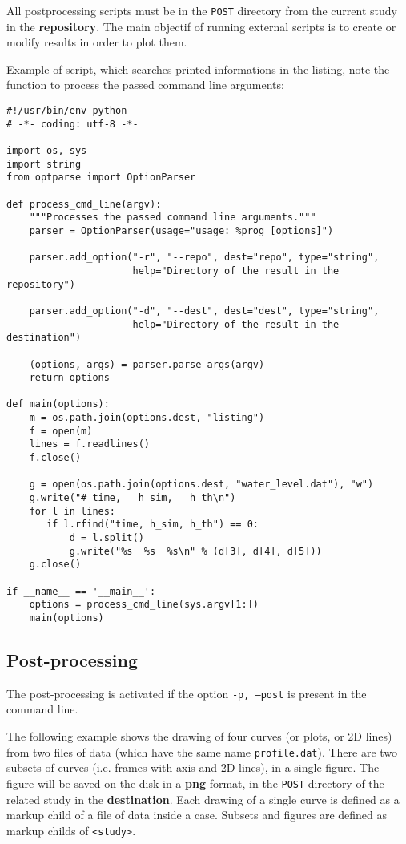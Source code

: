 \documentclass[a4paper,10pt,twoside]{csshortdoc}
\begin{document}
All postprocessing scripts must be in the \texttt{POST} directory from
the current study in the \textbf{repository}.
The main objectif of running external scripts is to create or modify
results in order to plot them.

Example of script, which searches printed informations in the listing,
note the function to process the passed command line arguments:
\small
\begin{verbatim}
#!/usr/bin/env python
# -*- coding: utf-8 -*-

import os, sys
import string
from optparse import OptionParser

def process_cmd_line(argv):
    """Processes the passed command line arguments."""
    parser = OptionParser(usage="usage: %prog [options]")

    parser.add_option("-r", "--repo", dest="repo", type="string",
                      help="Directory of the result in the repository")

    parser.add_option("-d", "--dest", dest="dest", type="string",
                      help="Directory of the result in the destination")

    (options, args) = parser.parse_args(argv)
    return options

def main(options):
    m = os.path.join(options.dest, "listing")
    f = open(m)
    lines = f.readlines()
    f.close()

    g = open(os.path.join(options.dest, "water_level.dat"), "w")
    g.write("# time,   h_sim,   h_th\n")
    for l in lines:
       if l.rfind("time, h_sim, h_th") == 0:
           d = l.split()
           g.write("%s  %s  %s\n" % (d[3], d[4], d[5]))
    g.close()

if __name__ == '__main__':
    options = process_cmd_line(sys.argv[1:])
    main(options)
\end{verbatim}
\normalsize

\subsection{Post-processing}

The post-processing is activated if the option \texttt{-p, --post} is present
in the command line.

The following example shows the drawing of four curves (or plots, or 2D lines)
from two files of data (which have the same name \texttt{profile.dat}). There
are two subsets of curves (i.e. frames with axis and 2D lines), in a single
figure. The figure will be saved on the disk in a \textbf{png} format, in the
\texttt{POST} directory of the related study in the \textbf{destination}. Each
drawing of a single curve is defined as a markup child of a file of data inside
a case. Subsets and figures are defined as markup childs of \texttt{<study>}.
\end{document}
